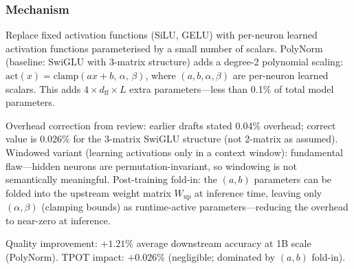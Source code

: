 \documentclass[11pt]{article}
\begin{document}
\subsubsection*{Mechanism}
Replace fixed activation functions (SiLU, GELU) with per-neuron learned activation functions parameterised by a small number of scalars.
PolyNorm (baseline: SwiGLU with 3-matrix structure) adds a degree-2 polynomial scaling: $\text{act}(x) = \text{clamp}(ax + b,\, \alpha,\, \beta)$, where $(a, b, \alpha, \beta)$ are per-neuron learned scalars.
This adds $4 \times d_\text{ff} \times L$ extra parameters---less than 0.1\% of total model parameters.

Overhead correction from review: earlier drafts stated 0.04\% overhead; correct value is 0.026\% for the 3-matrix SwiGLU structure (not 2-matrix as assumed).
Windowed variant (learning activations only in a context window): fundamental flaw---hidden neurons are permutation-invariant, so windowing is not semantically meaningful.
Post-training fold-in: the $(a, b)$ parameters can be folded into the upstream weight matrix $W_\text{up}$ at inference time, leaving only $(\alpha, \beta)$ (clamping bounds) as runtime-active parameters---reducing the overhead to near-zero at inference.

Quality improvement: $+1.21\%$ average downstream accuracy at 1B scale (PolyNorm).
TPOT impact: $+0.026\%$ (negligible; dominated by $(a,b)$ fold-in).
\end{document}
